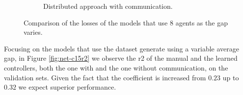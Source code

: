 \begin{figure}[!htb]
\begin{center}
\begin{subfigure}[h]{0.49\textwidth}
			\caption{Distributed approach with communication.}
		\end{subfigure}	
	\end{center}
	\vspace{-0.5cm}
	\caption[Comparison of the losses of the models that use $8$ 
	agents.]{Comparison of the losses of the models that use $8$ agents as 
	the gap 
		varies.}
	\label{fig:commlossN8}
\end{figure}

Focusing on the models that use the dataset generate using a variable average 
gap, in Figure \ref{fig:net-c15r2} we observe the \gls{r2} of the manual and the 
learned controllers, both the one with and the one without communication, on 
the validation sets.
Given the fact that the coefficient is increased from $0.23$ up to $0.32$ we 
expect superior performance.  
